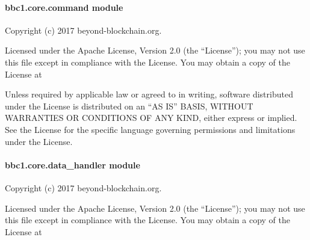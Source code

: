 \documentclass[letterpaper,10pt,english]{sphinxmanual}
\begin{document}
\paragraph{bbc1.core.command module}
\label{\detokenize{bbc1.core.command:module-bbc1.core.command}}\label{\detokenize{bbc1.core.command::doc}}\label{\detokenize{bbc1.core.command:bbc1-core-command-module}}
Copyright (c) 2017 beyond-blockchain.org.

Licensed under the Apache License, Version 2.0 (the “License”);
you may not use this file except in compliance with the License.
You may obtain a copy of the License at
\begin{quote}

\end{quote}

Unless required by applicable law or agreed to in writing, software
distributed under the License is distributed on an “AS IS” BASIS,
WITHOUT WARRANTIES OR CONDITIONS OF ANY KIND, either express or implied.
See the License for the specific language governing permissions and
limitations under the License.

\begin{fulllineitems}
\label{\detokenize{bbc1.core.command:bbc1.core.command.parser}}
\end{fulllineitems}



\paragraph{bbc1.core.data\_handler module}
\label{\detokenize{bbc1.core.data_handler:bbc1-core-data-handler-module}}\label{\detokenize{bbc1.core.data_handler::doc}}\label{\detokenize{bbc1.core.data_handler:module-bbc1.core.data_handler}}
Copyright (c) 2017 beyond-blockchain.org.

Licensed under the Apache License, Version 2.0 (the “License”);
you may not use this file except in compliance with the License.
You may obtain a copy of the License at
\begin{quote}

\end{quote}
\end{document}
